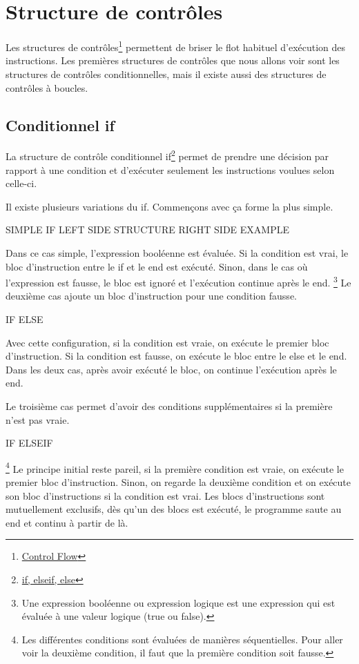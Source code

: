 \documentclass{tufte-handout}
\begin{document}
\section{Structure de contrôles}
Les structures de contrôles\footnote{\href{https://www.mathworks.com/help/matlab/control-flow.html}{Control Flow}} permettent de briser le flot habituel d'exécution des instructions. Les premières structures de contrôles que nous allons voir sont les structures de contrôles conditionnelles, mais il existe aussi des structures de contrôles à boucles.
\subsection{Conditionnel if}
La structure de contrôle conditionnel if\footnote{\href{https://www.mathworks.com/help/matlab/ref/if.html}{if, elseif, else}} permet de prendre une décision par rapport à une condition et d'exécuter seulement les instructions voulues selon celle-ci.

Il existe plusieurs variations du if. Commençons avec ça forme la plus simple.

SIMPLE IF LEFT SIDE STRUCTURE RIGHT SIDE EXAMPLE

Dans ce cas simple, l'expression booléenne est évaluée. Si la condition est vrai, le bloc d'instruction entre le if et le end est exécuté. Sinon, dans le cas où l'expression est fausse, le bloc est ignoré et l'exécution continue après le end.
\footnote{Une expression booléenne ou expression logique est une expression qui est évaluée à une valeur logique (true ou false).}
Le deuxième cas ajoute un bloc d'instruction pour une condition fausse.

IF ELSE

Avec cette configuration, si la condition est vraie, on exécute le premier bloc d'instruction. Si la condition est fausse, on exécute le bloc entre le else et le end. Dans les deux cas, après avoir exécuté le bloc, on continue l'exécution après le end.

Le troisième cas permet d'avoir des conditions supplémentaires si la première n'est pas vraie.

IF ELSEIF

\footnote{Les différentes conditions sont évaluées de manières séquentielles. Pour aller voir la deuxième condition, il faut que la première condition soit fausse.}
Le principe initial reste pareil, si la première condition est vraie, on exécute le premier bloc d'instruction. Sinon, on regarde la deuxième condition et on exécute son bloc d'instructions si la condition est vrai.
Les blocs d'instructions sont mutuellement exclusifs, dès qu'un des blocs est exécuté, le programme saute au end et continu à partir de là.
\end{document}
